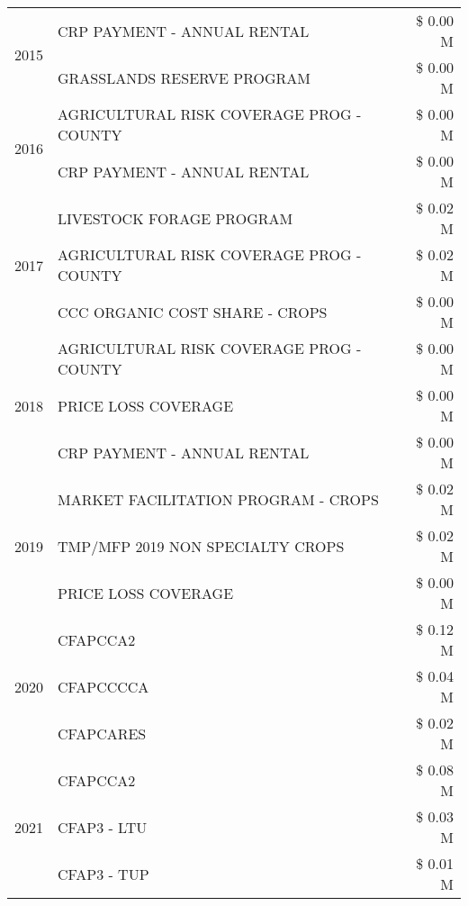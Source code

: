 \begin{tabular}{llr}
\cline{1-3}
\multirow[t]{2}{*}{2015} & CRP PAYMENT - ANNUAL RENTAL & \$ 0.00 M \\
 & GRASSLANDS RESERVE PROGRAM & \$ 0.00 M \\
\cline{1-3}
\multirow[t]{2}{*}{2016} & AGRICULTURAL RISK COVERAGE PROG - COUNTY & \$ 0.00 M \\
 & CRP PAYMENT - ANNUAL RENTAL & \$ 0.00 M \\
\cline{1-3}
\multirow[t]{3}{*}{2017} & LIVESTOCK FORAGE PROGRAM & \$ 0.02 M \\
 & AGRICULTURAL RISK COVERAGE PROG - COUNTY & \$ 0.02 M \\
 & CCC ORGANIC COST SHARE - CROPS & \$ 0.00 M \\
\cline{1-3}
\multirow[t]{3}{*}{2018} & AGRICULTURAL RISK COVERAGE PROG - COUNTY & \$ 0.00 M \\
 & PRICE LOSS COVERAGE & \$ 0.00 M \\
 & CRP PAYMENT - ANNUAL RENTAL & \$ 0.00 M \\
\cline{1-3}
\multirow[t]{3}{*}{2019} & MARKET FACILITATION PROGRAM - CROPS & \$ 0.02 M \\
 & TMP/MFP 2019 NON SPECIALTY CROPS & \$ 0.02 M \\
 & PRICE LOSS COVERAGE & \$ 0.00 M \\
\cline{1-3}
\multirow[t]{3}{*}{2020} & CFAPCCA2 & \$ 0.12 M \\
 & CFAPCCCCA & \$ 0.04 M \\
 & CFAPCARES & \$ 0.02 M \\
\cline{1-3}
\multirow[t]{3}{*}{2021} & CFAPCCA2 & \$ 0.08 M \\
 & CFAP3 - LTU & \$ 0.03 M \\
 & CFAP3 - TUP & \$ 0.01 M \\
\cline{1-3}
\bottomrule
\end{tabular}
